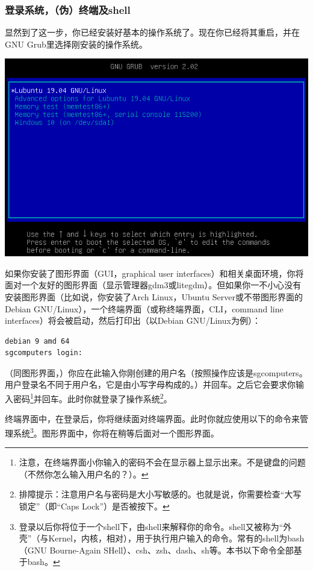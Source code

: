 \documentclass{book}
\begin{document}
\subsubsection{登录系统，（伪）终端及shell} 
\cite{intro1}\par
显然到了这一步，你已经安装好基本的操作系统了。现在你已经将其重启，并在GNU Grub里选择刚安装的操作系统。
\begin{center}
	\includegraphics[scale=0.6]{pic/lubstart}
\end{center}
如果你安装了图形界面（GUI，graphical user interfaces）和相关桌面环境，你将面对一个友好的图形界面（显示管理器gdm3或litegdm）。但如果你一不小心没有安装图形界面（比如说，你安装了Arch Linux，Ubuntu Server或不带图形界面的Debian GNU/Linux），一个终端界面（或称终端界面，CLI，command line interfaces）将会被启动，然后打印出（以Debian GNU/Linux为例）：
\begin{verbatim}
debian 9 amd 64
sgcomputers login:
\end{verbatim}
（同图形界面，）你应在此输入你刚创建的用户名（按照操作应该是sgcomputers。用户登录名不同于用户名，它是由小写字母构成的。）并回车。之后它会要求你输入密码\footnote{注意，在终端界面小你输入的密码不会在显示器上显示出来。不是键盘的问题（不然你怎么输入用户名的？）。}并回车。此时你就登录了操作系统\footnote{排障提示：注意用户名与密码是大小写敏感的。也就是说，你需要检查“大写锁定”（即“Caps Lock”）是否被按下。}。\par
终端界面中，在登录后，你将继续面对终端界面。此时你就应使用以下的命令来管理系统\footnote{登录以后你将位于一个shell下，由shell来解释你的命令。shell又被称为“外壳”（与Kernel，内核，相对），用于执行用户输入的命令。常有的shell为bash（GNU Bourne-Again SHell）、csh、zsh、dash、sh等。本书以下命令全部基于bash。}。图形界面中，你将在稍等后面对一个图形界面。\par
\end{document}
